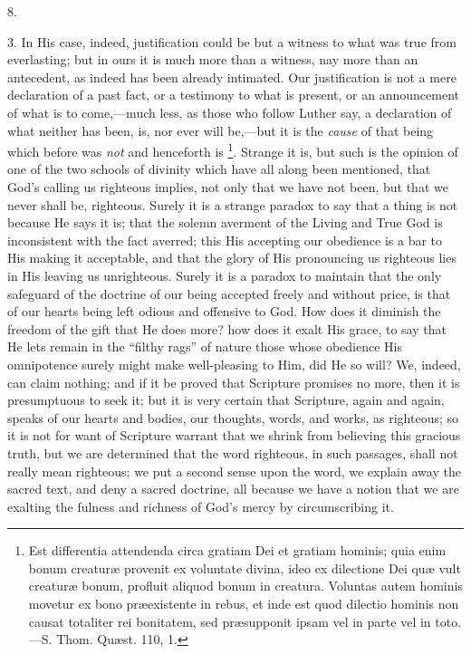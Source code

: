 8.

3. In His case, indeed, justification could be but a witness to
what was true from everlasting; but in ours it is much more than a
witness, nay more than an antecedent, as indeed has been already
intimated. Our justification is not a mere declaration of a past fact,
or a testimony to what is present, or an announcement of what is to
come,—much less, as those who follow Luther say, a declaration of
what neither has been, is, nor ever will be,—but it is the \emph{cause}
of that being which before was \emph{not} and henceforth is \footnote{Est differentia
attendenda circa gratiam Dei et gratiam hominis; quia enim bonum
creaturæ provenit ex voluntate divina, ideo ex dilectione Dei quæ
vult creaturæ bonum, profluit aliquod bonum in creatura. Voluntas
autem hominis movetur ex bono præexistente in rebus, et inde est quod
dilectio hominis non causat totaliter rei bonitatem, sed præsupponit
ipsam vel in parte vel in toto.—S. Thom. Quæst. 110, 1.}. Strange it is, but such is the opinion of one of the two
schools of divinity which have all along been mentioned, that God's
calling us righteous implies, not only that we have not been, but that
we never shall be, righteous. Surely it is a strange paradox to say
that a thing is not because He says it is; that the solemn averment of
the Living and True God is inconsistent with the fact averred; this
His accepting our obedience is a bar to His making it acceptable, and
that the glory of His pronouncing us righteous lies in His leaving us
unrighteous. Surely it is a paradox to maintain that the only
safeguard of the doctrine of our being accepted freely and without
price, is that of our hearts being left odious and offensive to
God. How does it diminish the freedom of the gift that He does more?
how does it exalt His grace, to say that He lets remain in the
``filthy rags'' of nature those whose obedience His
omnipotence surely might make well-pleasing to Him, did He so will?
We, indeed, can claim nothing; and if it be proved that Scripture
promises no more, then it is presumptuous to seek it; but it is very
certain that Scripture, again and again, speaks of our hearts and
bodies, our thoughts, words, and works, as righteous; so it is not for
want of Scripture warrant that we shrink from believing this gracious
truth, but we are determined that the word righteous, in such
passages, shall not really mean righteous; we put a second sense upon
the word, we explain away the sacred text, and deny a sacred doctrine,
all because we have a notion that we are exalting the fulness and
richness of God's mercy by circumscribing it.

